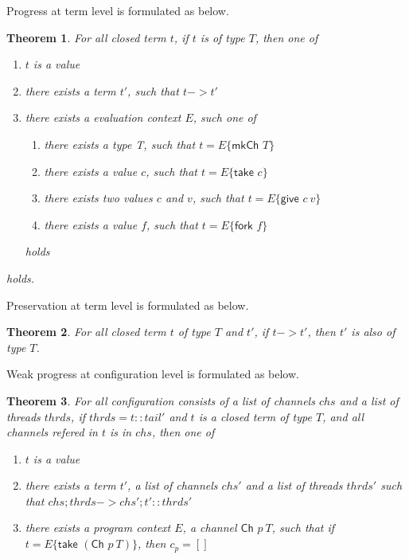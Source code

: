 \documentclass{article}
\newtheorem{theorem}{Theorem}
\newcommand{\sco}[1]{\textsf{#1}}
\newcommand{\fork}[1]{\sco{fork }#1}
\newcommand{\give}[2]{\sco{give } #1\ #2}
\newcommand{\take}[1]{\sco{take } #1}
\newcommand{\mkch}[1]{\sco{mkCh } #1}
\newcommand{\channel}[2]{\sco{Ch }#1\ #2}
\begin{document}
Progress at term level is formulated as below.

\begin{theorem}
    For all closed term $t$, if $t$ is of type $T$, then one of
    \begin{enumerate}
        \item $t$ is a value
        \item there exists a term $t'$, such that $t -> t'$
        \item there exists a evaluation context $E$, such one of
                \begin{enumerate}
                    \item there exists a type T, such that $t = E\{\mkch{T}\}$
                    \item there exists a value $c$, such that $t = E\{\take{c}\}$
                    \item there exists two values $c$ and $v$, such that $t = E\{\give{c}{v}\}$
                    \item there exists a value $f$, such that $t = E\{\fork{f}\}$
                \end{enumerate}
              holds
    \end{enumerate}
    holds.
\end{theorem}

Preservation at term level is formulated as below.

\begin{theorem}
    For all closed term $t$ of type $T$ and $t'$, if $t -> t'$, then $t'$ is also of type $T$.
\end{theorem}

Weak progress at configuration level is formulated as below.

\begin{theorem}
    For all configuration consists of a list of channels $chs$ and a list of threads $thrds$,
    if $thrds = t :: tail'$ and $t$ is a closed term of type $T$, and all channels refered in $t$ is
    in $chs$, then one of
    \begin{enumerate}
        \item $t$ is a value
        \item there exists a term $t'$, a list of channels $chs'$ and a list of threads $thrds'$
                such that $chs;thrds -> chs';t' :: thrds'$
        \item there exists a program context $E$, a channel $\channel{p}{T}$, such that
                if $t = E\{\take{(\channel{p}{T})}\}$, then $c_p = []$
    \end{enumerate}
\end{theorem}
\end{document}
